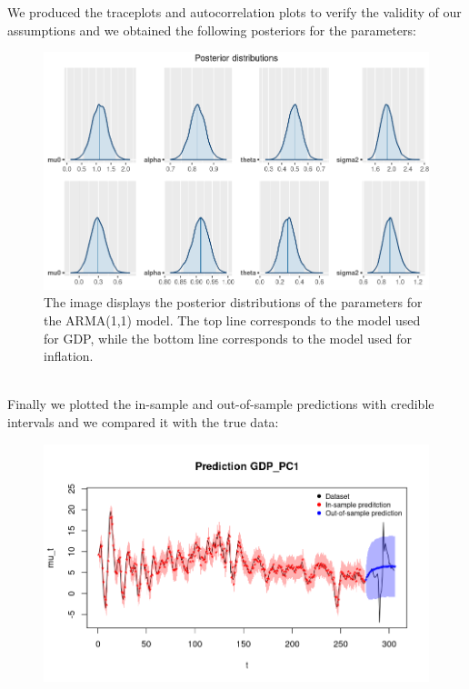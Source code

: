 We produced the traceplots and autocorrelation plots to verify the validity of our assumptions and we obtained the following posteriors for the parameters: \\
\begin{figure}[h]
    \centering
    \includegraphics[width=\textwidth]{images/4-ARMA/posteriors.png}
    \caption{The image displays the posterior distributions of the parameters for the ARMA(1,1) model. The top line corresponds to the model used for GDP, while the bottom line corresponds to the model used for inflation.}
    \label{fig:ARMA_posteriors}
\end{figure} \\
Finally we plotted the in-sample and out-of-sample predictions with credible intervals and we compared it with the true data: \\   
\begin{figure}
    \centering
    \includegraphics[width=\textwidth]{images/4-ARMA/gdp_prediction.png}
    \label{fig:ARMA_first}
\end{figure} 
